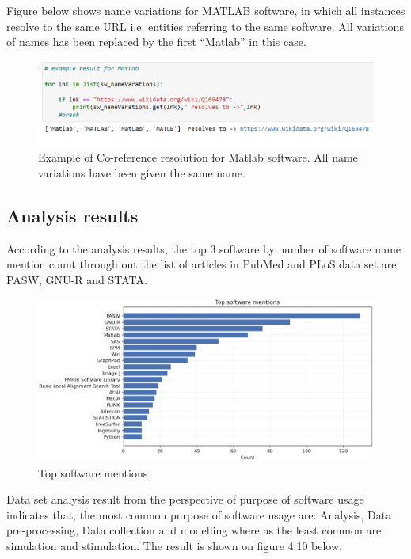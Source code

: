 Figure below shows name variations for MATLAB software, in which all instances resolve to the same URL i.e. entities referring to the same software. All variations of names has been replaced by the first “Matlab” in this case.

\begin{figure}[htbp]
	\centering
	\includegraphics[width=1\textwidth]{4.graphics/figures/ch_4/pdf/Corefresolution}
	\caption{Example of Co-reference resolution for Matlab software. All name variations have been given the same name.}
	\label{fig:chapter04:setup}
\end{figure}


\subsection{Analysis results }
\label{subsec:dataset:Analysis:results}

According to the analysis results, the top 3 software by number of software name mention count through out the list of articles in PubMed and PLoS data set are: PASW, GNU-R and STATA.  

\begin{figure}[htbp]
	\centering
	\includegraphics[width=1\textwidth]{4.graphics/figures/ch_4/analysisresults/1.Top software mentions}
	\caption{Top software mentions}
	\label{fig:chapter03:setup}
\end{figure}

Data set analysis result from the perspective of purpose of software usage indicates that, the most common purpose of software usage are: Analysis, Data pre-processing, Data collection and modelling where as the least common are simulation and stimulation. The result is shown on figure 4.10 below. \\

